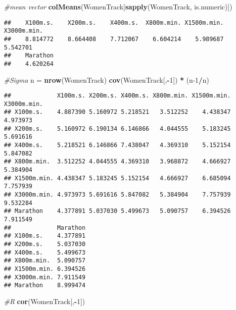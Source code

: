 \documentclass[
]{article}
\newenvironment{Shaded}{\begin{snugshade}}{\end{snugshade}}
\newcommand{\CommentTok}[1]{\textcolor[rgb]{0.56,0.35,0.01}{\textit{#1}}}
\newcommand{\DecValTok}[1]{\textcolor[rgb]{0.00,0.00,0.81}{#1}}
\newcommand{\KeywordTok}[1]{\textcolor[rgb]{0.13,0.29,0.53}{\textbf{#1}}}
\newcommand{\NormalTok}[1]{#1}
\newcommand{\OperatorTok}[1]{\textcolor[rgb]{0.81,0.36,0.00}{\textbf{#1}}}
\newcommand{\StringTok}[1]{\textcolor[rgb]{0.31,0.60,0.02}{#1}}
\begin{document}
\begin{Shaded}
\begin{Highlighting}[]
\CommentTok{#mean vector}
\KeywordTok{colMeans}\NormalTok{(WomenTrack[}\KeywordTok{sapply}\NormalTok{(WomenTrack, is.numeric)])}
\end{Highlighting}
\end{Shaded}

\begin{verbatim}
##    X100m.s.    X200m.s.    X400m.s.  X800m.min. X1500m.min. X3000m.min. 
##    8.814772    8.664408    7.712067    6.604214    5.989687    5.542701 
##    Marathon 
##    4.620264
\end{verbatim}

\begin{Shaded}
\begin{Highlighting}[]
\CommentTok{#Sigma}
\NormalTok{n =}\StringTok{ }\KeywordTok{nrow}\NormalTok{(WomenTrack)}
\KeywordTok{cov}\NormalTok{(WomenTrack[,}\OperatorTok{-}\DecValTok{1}\NormalTok{]) }\OperatorTok{*}\StringTok{ }\NormalTok{(n}\DecValTok{-1}\OperatorTok{/}\NormalTok{n)}
\end{Highlighting}
\end{Shaded}

\begin{verbatim}
##             X100m.s. X200m.s. X400m.s. X800m.min. X1500m.min. X3000m.min.
## X100m.s.    4.887390 5.160972 5.218521   3.512252    4.438347    4.973973
## X200m.s.    5.160972 6.190134 6.146866   4.044555    5.183245    5.691616
## X400m.s.    5.218521 6.146866 7.438047   4.369310    5.152154    5.847082
## X800m.min.  3.512252 4.044555 4.369310   3.968872    4.666927    5.384904
## X1500m.min. 4.438347 5.183245 5.152154   4.666927    6.685094    7.757939
## X3000m.min. 4.973973 5.691616 5.847082   5.384904    7.757939    9.532284
## Marathon    4.377891 5.037030 5.499673   5.090757    6.394526    7.911549
##             Marathon
## X100m.s.    4.377891
## X200m.s.    5.037030
## X400m.s.    5.499673
## X800m.min.  5.090757
## X1500m.min. 6.394526
## X3000m.min. 7.911549
## Marathon    8.999474
\end{verbatim}

\begin{Shaded}
\begin{Highlighting}[]
\CommentTok{#R}
\KeywordTok{cor}\NormalTok{(WomenTrack[,}\OperatorTok{-}\DecValTok{1}\NormalTok{])}
\end{Highlighting}
\end{Shaded}
\end{document}
